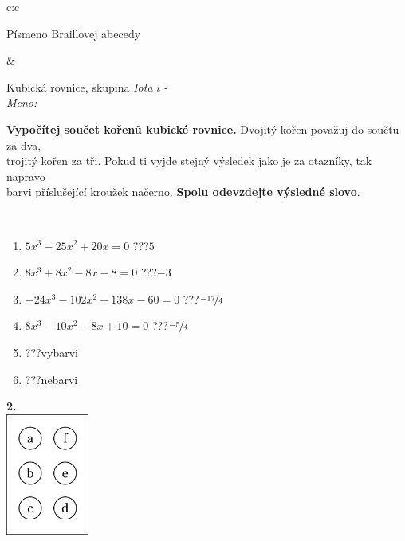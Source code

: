 \documentclass[10pt]{report}
\begin{document}
\begin{tabular}{c:c}
\begin{minipage}[c][104.5mm][t]{0.5\linewidth}
\begin{center}
\begin{minipage}{0.20\linewidth}
\begin{center}
{\small Písmeno Braillovej abecedy}
\end{center}
\end{minipage}
\end{center}
\end{minipage}
&
\begin{minipage}[c][104.5mm][t]{0.5\linewidth}
\begin{center}
\vspace{7mm}
{\huge Kubická rovnice, skupina \textit{Iota $\iota$} -}\\[5mm]
\textit{Meno:}\phantom{xxxxxxxxxxxxxxxxxxxxxxxxxxxxxxxxxxxxxxxxxxxxxxxxxxxxxxxxxxxxxxxxx}\\[5mm]
\begin{minipage}{0.95\linewidth}
\textbf{Vypočítej součet kořenů kubické rovnice.} Dvojitý kořen považuj do součtu za dva,\\trojitý kořen za tři. Pokud ti vyjde stejný výsledek jako je za otazníky, tak napravo\\barvi příslušející kroužek načerno. \textbf{Spolu odevzdejte výsledné slovo}.
\end{minipage}
\\[1mm]
\begin{minipage}{0.79\linewidth}
\begin{center}
\begin{varwidth}{\linewidth}
\begin{enumerate}
\Large
\item $5x^3-25x^2+20x=0$\quad \dotfill\; ???\;\dotfill \quad $5$
\item $8x^3+8x^2-8x-8=0$\quad \dotfill\; ???\;\dotfill \quad $-3$
\item $-24x^3-102x^2-138x-60=0$\quad \dotfill\; ???\;\dotfill \quad $\nicefrac{-17}{4}$
\item $8x^3-10x^2-8x+10=0$\quad \dotfill\; ???\;\dotfill \quad $\nicefrac{-5}{4}$
\item \quad \dotfill\; ???\;\dotfill \quad vybarvi
\item \quad \dotfill\; ???\;\dotfill \quad nebarvi
\end{enumerate}
\end{varwidth}
\end{center}
\end{minipage}
\begin{minipage}{0.20\linewidth}
\begin{center}
{\Huge\bfseries 2.} \\[2mm]
\includegraphics[height=40mm]{../images/braille.png}

\end{center}
\end{minipage}
\end{center}
\end{minipage}
\end{tabular}
\end{document}
